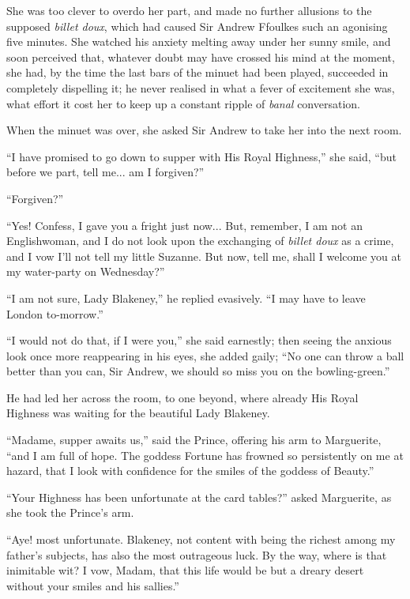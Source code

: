She was too clever to overdo her part, and made no further allusions to the supposed \textit{billet doux}, which had caused Sir Andrew Ffoulkes such an agonising five minutes. She watched his anxiety melting away under her sunny smile, and soon perceived that, whatever doubt may have crossed his mind at the moment, she had, by the time the last bars of the minuet had been played, succeeded in completely dispelling it; he never realised in what a fever of excitement she was, what effort it cost her to keep up a constant ripple of \textit{banal} conversation.

When the minuet was over, she asked Sir Andrew to take her into the next room.

\enquote{I have promised to go down to supper with His Royal Highness,} she said, \enquote{but before we part, tell me... am I forgiven?}

\enquote{Forgiven?}

\enquote{Yes! Confess, I gave you a fright just now... But, remember, I am not an Englishwoman, and I do not look upon the exchanging of \textit{billet doux} as a crime, and I vow I'll not tell my little Suzanne. But now, tell me, shall I welcome you at my water-party on Wednesday?}

\enquote{I am not sure, Lady Blakeney,} he replied evasively. \enquote{I may have to leave London to-morrow.}

\enquote{I would not do that, if I were you,} she said earnestly; then seeing the anxious look once more reappearing in his eyes, she added gaily; \enquote{No one can throw a ball better than you can, Sir Andrew, we should so miss you on the bowling-green.}

He had led her across the room, to one beyond, where already His Royal Highness was waiting for the beautiful Lady Blakeney.

\enquote{Madame, supper awaits us,} said the Prince, offering his arm to Marguerite, \enquote{and I am full of hope. The goddess Fortune has frowned so persistently on me at hazard, that I look with confidence for the smiles of the goddess of Beauty.}

\enquote{Your Highness has been unfortunate at the card tables?} asked Marguerite, as she took the Prince's arm.

\enquote{Aye! most unfortunate. Blakeney, not content with being the richest among my father's subjects, has also the most outrageous luck. By the way, where is that inimitable wit? I vow, Madam, that this life would be but a dreary desert without your smiles and his sallies.}

